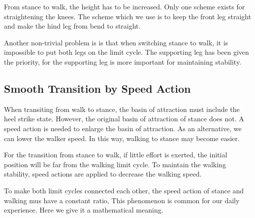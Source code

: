 From stance to walk, the height has to be increased.
Only one scheme exists for straightening the knees.
The scheme which we use is to keep the front leg straight and make the hind leg from bend to straight.


Another non-trivial problem is is that when switching stance to walk, it is impossible to put both legs on the limit cycle.
The supporting leg has been given the priority, for the supporting leg is more important for maintaining stability.





\subsection{Smooth Transition by  Speed Action}
When transiting from walk to stance, the basin of attraction must include the heel strike state.
However, the original basin of attraction of stance does not. 
A speed action is needed to enlarge the basin of attraction.
As an alternative, we can lower the walker speed. 
In this way, walking to stance may become easier.

For the transition from stance to walk, if little effort is exerted, the initial position will be far from the walking limit cycle.
To maintain the walking stability, speed actions are applied to decrease the walking speed.

To make both limit cycles connected each other, the speed action of stance and walking mus have a constant ratio,
This phenomenon is common for our daily experience.
Here we give it a mathematical meaning.

























